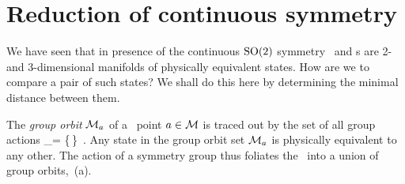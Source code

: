 \documentclass{jfm}
\begin{document}
\section{Reduction of continuous symmetry}
\label{s:slice}

We have seen that in presence of the continuous $\textrm{SO}(2)$ symmetry
\reqva\ and \rpo s are 2- and 3-dimensional manifolds of physically
equivalent states. How are we to compare a pair of such states? We shall
do this here by determining the minimal distance between them.

The \emph{group orbit} $\pS_\ssp $ of a \statesp\ point $\ssp \in \pS$ is
traced out by the set of all group actions
\beq
\pS_\ssp = \{\LieEl\,\ssp \mid \LieEl \in {\Group}\}
\,.
Any state in the  group orbit set $\pS_{\ssp}$
is physically equivalent to any other. The action of a symmetry group
thus foliates the \statesp\ into a union of group orbits,
\,(a).
\end{document}
